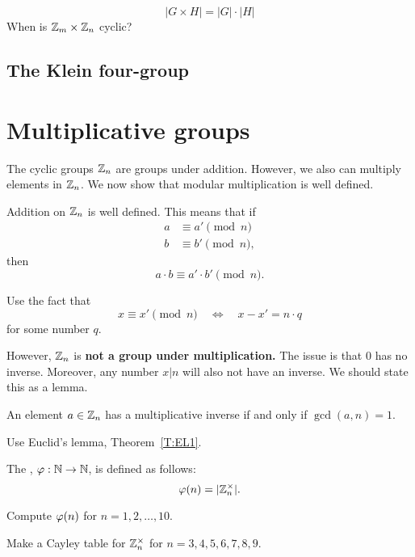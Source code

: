 \documentclass{ximera}
\begin{document}
\[
|G\times H| = |G|\cdot |H|
\]
When is $\mathbb Z_m\times\mathbb Z_n$ cyclic?






\subsection{The Klein four-group}












\section{Multiplicative groups}


The cyclic groups $\mathbb Z_n$ are groups under addition. However, we also
can multiply elements in $\mathbb Z_n$. We now show that modular
multiplication is well defined.

\begin{lemma}
  Addition on $\mathbb Z_n$ is well defined. This means that if
  \begin{align*}
    a &\equiv a' \pmod{n}\\
    b &\equiv b' \pmod{n},
  \end{align*}
  then
  \[
  a\cdot b \equiv a'\cdot b' \pmod{n}.
  \]
  \begin{sketch}
    Use the fact that
    \[
    x \equiv x'\pmod{n} \quad \Leftrightarrow \quad x -x' = n\cdot q
    \]
    for some number $q$.
  \end{sketch}
\end{lemma}

However, $\mathbb Z_n$ is \textbf{not a group under multiplication.} The
issue is that $0$ has no inverse. Moreover, any number $x|n$ will also
not have an inverse. We should state this as a lemma.

\begin{lemma}
  An element $a\in\mathbb Z_n$ has a multiplicative inverse if and only if
  $\gcd(a,n) = 1$.
  \begin{sketch}
    Use Euclid's lemma, Theorem~\ref{T:EL1}.
  \end{sketch}
\end{lemma}

\begin{definition}
  The , $\eulerphi:\N\to\N$, is defined as
  follows:
  \[
  \eulerphi(n) = |\Z_n^\times|.
  \]
\end{definition}

\begin{exercise}
  Compute $\eulerphi(n)$ for $n = 1,2,\dots, 10$.
\end{exercise}


\begin{exercise}
  Make a Cayley table for $\mathbb Z_n^\times$ for $n = 3,4,5,6,7,8,9$.
\end{exercise}
\end{document}
